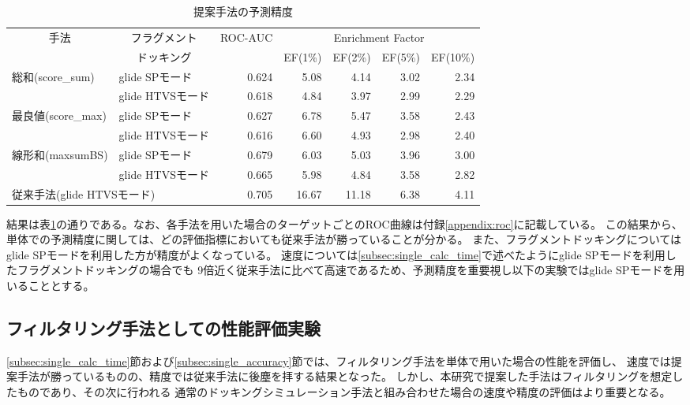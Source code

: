 \begin{table}[htb] \centering
	\caption{提案手法の予測精度}
	\label{table:single_accuracy}
	\begin{tabular}{l|l|rrrrr}
	\hline
	\multicolumn{1}{c|}{\multirow{2}{*}{手法}}	&\multicolumn{1}{c|}{フラグメント}		&\multirow{2}{*}{ROC-AUC}	&\multicolumn{4}{c}{Enrichment Factor}	\\
										&\multicolumn{1}{c|}{ドッキング}		&						&EF(1\%)	&EF(2\%)	&EF(5\%)	&EF(10\%)	\\ \hline
	\multirow{2}{*}{総和(score\_sum)}			&glide SPモード					&0.624					&5.08	&4.14	&3.02	&2.34		\\
										&glide HTVSモード					&0.618					&4.84	&3.97	&2.99	&2.29		\\
	\multirow{2}{*}{最良値(score\_max)}		&glide SPモード					&0.627					&6.78	&5.47	&3.58	&2.43		\\
										&glide HTVSモード					&0.616					&6.60	&4.93	&2.98	&2.40		\\
	\multirow{2}{*}{線形和(maxsumBS)}		&glide SPモード					&0.679					&6.03	&5.03	&3.96	&3.00		\\
										&glide HTVSモード					&0.665					&5.98	&4.84	&3.58	&2.82		\\ \hline
	\multicolumn{2}{l|}{従来手法(glide HTVSモード)}							&0.705					&16.67	&11.18	&6.38	&4.11		\\ \hline
	\end{tabular}
\end{table}

結果は表\ref{table:single_accuracy}の通りである。なお、各手法を用いた場合のターゲットごとのROC曲線は付録\ref{appendix:roc}に記載している。
この結果から、単体での予測精度に関しては、どの評価指標においても従来手法が勝っていることが分かる。
また、フラグメントドッキングについてはglide SPモードを利用した方が精度がよくなっている。
速度については\ref{subsec:single_calc_time}で述べたようにglide SPモードを利用したフラグメントドッキングの場合でも
9倍近く従来手法に比べて高速であるため、予測精度を重要視し以下の実験ではglide SPモードを用いることとする。

\subsection{フィルタリング手法としての性能評価実験}
\ref{subsec:single_calc_time}節および\ref{subsec:single_accuracy}節では、フィルタリング手法を単体で用いた場合の性能を評価し、
速度では提案手法が勝っているものの、精度では従来手法に後塵を拝する結果となった。
しかし、本研究で提案した手法はフィルタリングを想定したものであり、その次に行われる
通常のドッキングシミュレーション手法と組み合わせた場合の速度や精度の評価はより重要となる。

